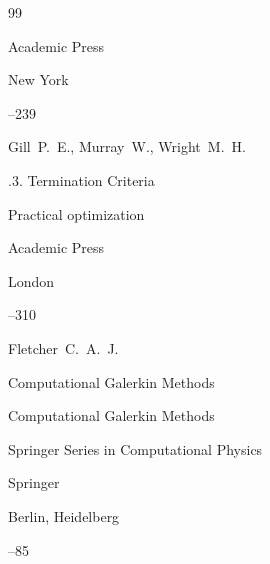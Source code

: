 \begin{thebibliography}{99}

\publ Academic Press

\publaddr New York

–239





\by Gill~P.~E., Murray~W., Wright~M.~H.

.3. Termination  Criteria

\inbook Practical optimization


\publ Academic Press

\publaddr London

--310




\by Fletcher~C.~A.~J.


\paper Computational Galerkin Methods

\inbook Computational Galerkin Methods

\serial Springer Series in Computational Physics

\publ Springer

\publaddr Berlin, Heidelberg


--85


























\end{thebibliography}
